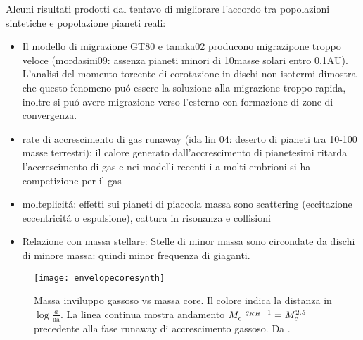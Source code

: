 
\begin{workout}
Alcuni risultati prodotti dal tentavo di migliorare l'accordo tra popolazioni sintetiche  e popolazione pianeti reali:
\begin{itemize}
\item Il modello di migrazione GT80 e tanaka02 producono migrazipone troppo veloce (mordasini09: assenza pianeti minori di 10masse solari entro 0.1AU). L'analisi del momento torcente di corotazione in dischi non isotermi dimostra che questo fenomeno pu\'o essere la soluzione alla migrazione troppo rapida, inoltre si pu\'o avere migrazione verso l'esterno con formazione di zone di convergenza.
\item rate di accrescimento di gas runaway (ida lin 04: deserto di pianeti tra 10-100 masse terrestri): il calore generato dall'accrescimento di pianetesimi ritarda l'accrescimento di gas e nei modelli recenti i a molti embrioni si ha competizione per il gas
\item molteplicit\'a: effetti sui pianeti di piaccola massa sono scattering (eccitazione eccentricit\'a o espulsione), cattura in risonanza e collisioni
\item Relazione con massa stellare: Stelle di minor massa sono circondate da dischi di minore massa: quindi minor frequenza di giaganti.%
\end{itemize}
\end{workout}


\begin{figure}[!ht]
\centering
\texttt{[image: envelopecoresynth]}
\caption{Massa inviluppo gassoso vs massa core. Il colore indica la distanza in $\log{\frac{a}{\si{\astronomicalunit}}}$. La linea continua mostra andamento $M_c^{-q_{KH}-1}=M_c^{2.5}$ precedente alla fase runaway di accrescimento gassoso. Da \cite{mordasini2018planetary}. }\label{fig:envelopecoresynth}
\end{figure}

